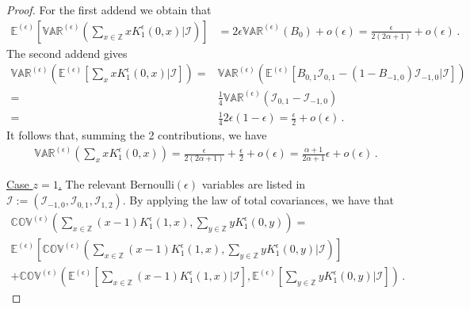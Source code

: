 \documentclass[a4paper,11pt,oneside,reqno]{amsart}
\theoremstyle{definition}
\numberwithin{equation}{section}
\begin{document}
\begin{proof}
For the first addend we obtain that 
\begin{equation*}
	\begin{split}
		\mathbb{E}^{(\epsilon)}\left[\mathbb{VAR}^{(\epsilon)}\left(\sum_{x\in \mathbb{Z}}xK_{1}^{\epsilon}(0,x)\bigg| \bm{\mathcal{I}}\right)\right]&= 
		2\epsilon \mathbb{VAR}^{(\epsilon)}(B_{0})+o(\epsilon)
		=
		\frac{\epsilon}{2(2\alpha+1)}+o(\epsilon)\,.
	\end{split}
\end{equation*}
{\color{black} The second addend gives
\begin{equation}
	\begin{split}
		\mathbb{VAR}^{(\epsilon)}\left(\mathbb{E}^{(\epsilon)}\left[\sum_{x}xK_{1}^{\epsilon}(0,x)\bigg|\mathbb{\mathcal{I}}\right]\right)=& \mathbb{VAR}^{(\epsilon)}\left(\mathbb{E}^{(\epsilon)}\left[B_{0,1}\mathcal{I}_{0,1}-(1-B_{-1,0})\mathcal{I}_{-1,0}\bigg|\mathbf{\mathcal{I}}\right]\right)
		\\=&\frac{1}{4}\mathbb{VAR}^{(\epsilon)}(\mathcal{I}_{0,1}-\mathcal{I}_{-1,0})
		\\=&\frac{1}{4}2\epsilon(1-\epsilon)=\frac{\epsilon}{2}+o(\epsilon)\,.
	\end{split}
\end{equation}
It follows that, summing the 2 contributions, we have
\begin{equation}
	\begin{split}
		\mathbb{VAR}^{(\epsilon)}\left(\sum_{x}xK_{1}^{\epsilon}(0,x)\right)= \frac{\epsilon}{2(2\alpha+1)}+\frac{\epsilon}{2}+o(\epsilon)= \frac{\alpha+1}{2\alpha+1}\epsilon+o(\epsilon)\,.
	\end{split}
\end{equation}}
\item{\underline{Case $z=1$.}} The relevant $\text{Bernoulli}(\epsilon)$ variables are listed in $\bm{\mathcal{I}}:=(\mathcal{I}_{-1,0},\mathcal{I}_{0,1},\mathcal{I}_{1,2})$. By applying the law of total covariances, we have that 
\begin{multline*}
		\mathbb{COV}^{(\epsilon)}\left(\sum_{x\in \mathbb{Z}}(x-1)K_{1}^{\epsilon}(1,x),\sum_{y\in \mathbb{Z}}yK_{1}^{\epsilon}(0,y)\right)
		=\\
		\mathbb{E}^{(\epsilon)}\left[\mathbb{COV}^{(\epsilon)}\left(\sum_{x\in \mathbb{Z}}(x-1)K_{1}^{\epsilon}(1,x),\sum_{y\in \mathbb{Z}}yK_{1}^{\epsilon}(0,y)\bigg|\bm{\mathcal{I}}\right)\right]
		\\+\mathbb{COV}^{(\epsilon)}\left(\mathbb{E}^{(\epsilon)}\left[\sum_{x\in \mathbb{Z}}(x-1)K_{1}^{\epsilon}(1,x)\bigg|\bm{\mathcal{I}}\right],\mathbb{E}^{(\epsilon)}\left[\sum_{y\in \mathbb{Z}}yK_{1}^{\epsilon}(0,y)\bigg|\bm{\mathcal{I}}\right]\right)\,.

\end{multline*}
\end{proof}
\end{document}
